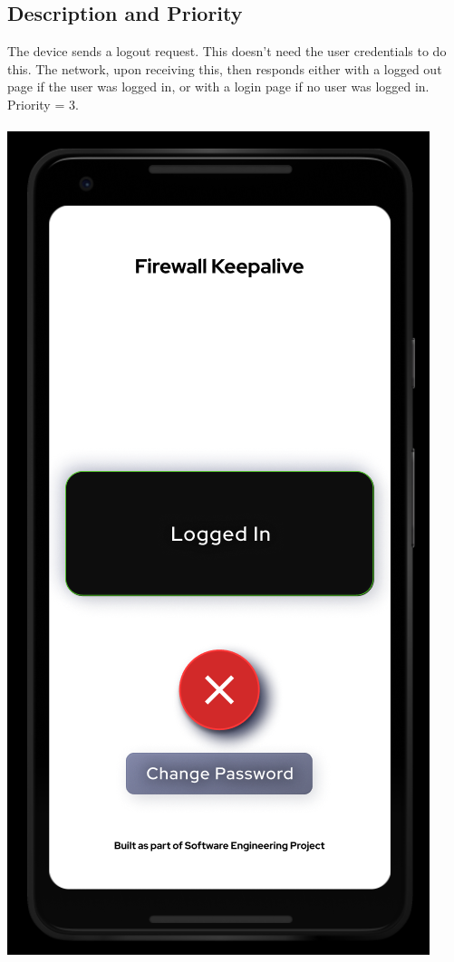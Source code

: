 \subsection{Description and Priority}
The device sends a logout request. This doesn't need the user credentials to do this. The network, upon receiving this, then responds either with a logged out page if the user was logged in, or with a login page if no user was logged in.
Priority = 3. \\ \\
\includegraphics[scale=0.3]{images/hello2.png}


